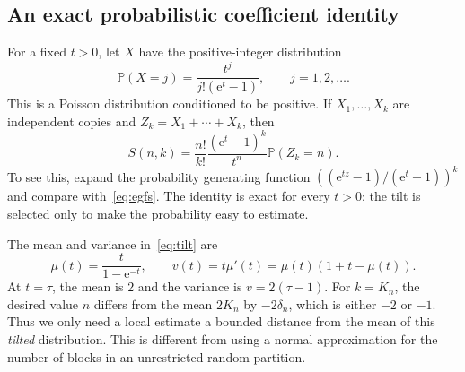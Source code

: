 \documentclass[11pt,a4paper]{article}
\numberwithin{equation}{section}
\theoremstyle{remark}
\newcommand{\e}{\mathrm e}
\newcommand{\Prob}{\mathbb P}
\begin{document}
\subsection{An exact probabilistic coefficient identity}
For a fixed $t>0$, let $X$ have the positive-integer distribution
\begin{equation}\label{eq:tilt}
 \Prob(X=j)=\frac{t^j}{j!(\e^t-1)},\qquad j=1,2,\ldots.
\end{equation}
This is a Poisson distribution conditioned to be positive. If
$X_1,\ldots,X_k$ are independent copies and $Z_k=X_1+\cdots+X_k$, then
\begin{equation}\label{eq:exacttilt}
 S(n,k)=\frac{n!}{k!}\frac{(\e^t-1)^k}{t^n}\Prob(Z_k=n).
\end{equation}
To see this, expand the probability generating function
$((\e^{tz}-1)/(\e^t-1))^k$ and compare with~\eqref{eq:egfs}.
The identity is exact for every $t>0$; the tilt is selected only to make
the probability easy to estimate.

The mean and variance in~\eqref{eq:tilt} are
\begin{equation}\label{eq:meanvar}
 \mu(t)=\frac{t}{1-\e^{-t}},\qquad
 v(t)=t\mu'(t)=\mu(t)(1+t-\mu(t)).
\end{equation}
At $t=\tau$, the mean is $2$ and the variance is $v=2(\tau-1)$.
For $k=K_n$, the desired value $n$ differs from the mean $2K_n$ by
$-2\delta_n$, which is either $-2$ or $-1$. Thus we only need a local
estimate a bounded distance from the mean of this \emph{tilted}
distribution. This is different from using a normal approximation for the
number of blocks in an unrestricted random partition.
\end{document}
